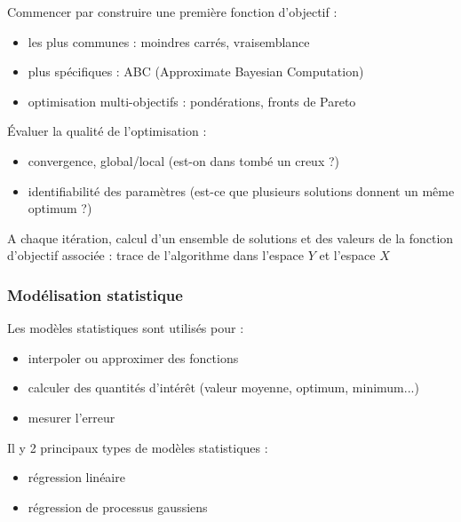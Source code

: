 \documentclass[10pt]{beamer}
\begin{document}
\begin{frame}
Commencer par construire une première fonction d'objectif :
\begin{itemize}
	\item les plus communes : moindres carrés, vraisemblance
	\item plus spécifiques : ABC (Approximate Bayesian Computation)
	\item optimisation multi-objectifs : pondérations, fronts de Pareto
\end{itemize}
\bigskip

Évaluer la qualité de l'optimisation :
\begin{itemize}
	\item convergence, global/local (est-on dans tombé un creux ?)
	\item identifiabilité des paramètres (est-ce que plusieurs solutions donnent un même optimum ?)
\end{itemize}
\bigskip

A chaque itération, calcul d'un ensemble de solutions et des valeurs de la fonction d'objectif associée  : trace de l'algorithme dans l'espace $ Y $ et l'espace $ X $

\end{frame}

\begin{frame}
\frametitle{Modélisation statistique}

Les modèles statistiques sont utilisés pour :

\begin{itemize}
	\item interpoler ou approximer des fonctions
	\item calculer des quantités d'intérêt (valeur moyenne, optimum, minimum...)
	\item mesurer l'erreur
\end{itemize}
\bigskip

Il y 2 principaux types de modèles statistiques :
\begin{itemize}
	\item régression linéaire
	\item régression de processus gaussiens
\end{itemize}

\end{frame}
\end{document}
